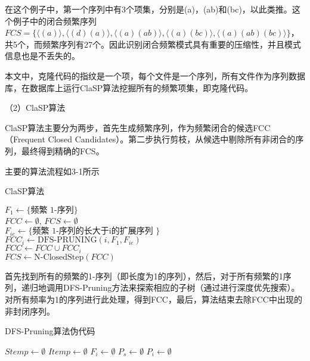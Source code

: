 在这个例子中，第一个序列中有3个项集，分别是(a)，(ab)和(bc)，以此类推。这个例子中的闭合频繁序列\( FCS = \{ \langle (a)\rangle, \langle (d)(a)\rangle, \langle (a)(ab)\rangle, \langle (a)(bc)\rangle, \langle (a)(ab)(bc)\rangle \}\)， 共5个，而频繁序列有27个。因此识别闭合频繁模式具有重要的压缩性，并且模式信息也是不丢失的。

本文中，克隆代码的指纹是一个项，每个文件是一个序列，所有文件作为序列数据库，在数据库上运行ClaSP算法挖掘所有的频繁项集，即克隆代码。

（2）ClaSP算法

ClaSP算法主要分为两步，首先生成频繁序列，作为频繁闭合的候选FCC（Frequent Closed Candidates）。第二步执行剪枝，从候选中剔除所有非闭合的序列，最终得到精确的FCS。

主要的算法流程如3-1所示

\begin{algorithm}
\caption{ClaSP算法}
\begin{algorithmic}
\State $F_1 \gets \{\text{频繁 1-序列}\}$ \\
\State $FCC \gets \emptyset$, $FCS \gets \emptyset$  \\
 {
    \State $F_{ie} \gets \{\text{频繁 1-序列的长大于i的扩展序列 } \}$ \\
    \State $FCC_i \gets \text{DFS-PRUNING}(i, F_1, F_{ie})$ \\
    \State $FCC \gets FCC \cup FCC_i$\\}
\EndFor
\State $FCS \gets \text{N-ClosedStep}(FCC)$
\end{algorithmic}
\end{algorithm}


首先找到所有的频繁的1-序列（即长度为1的序列），然后，对于所有频繁的1序列，递归地调用DFS-Pruning方法来探索相应的子树（通过进行深度优先搜索）。对所有频率为1的序列进行此处理，得到FCC，最后，算法结束去除FCC中出现的非封闭序列。


\begin{algorithm}[htbp]
\caption{DFS-Pruning算法伪代码}

$Stemp \gets \emptyset$ 
$Itemp \gets \emptyset$ 
$F_i \gets \emptyset$ 
$P_s \gets \emptyset$ 
$P_i \gets \emptyset$ \\
 \\
\end{algorithm}
    

